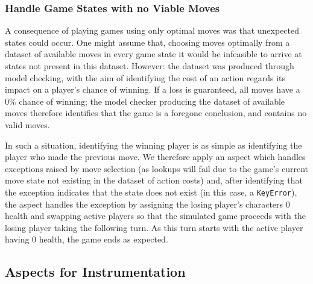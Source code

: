 \subsubsection{Handle Game States with no Viable Moves}


A consequence of playing games using only optimal moves was that unexpected
states could occur. One might assume that, choosing moves optimally from a
dataset of available moves in every game state it would be infeasible to arrive
at states not present in this dataset. However: the dataset was produced through
model checking, with the aim of identifying the cost of an action regards its
impact on a player's chance of winning. If a loss is guaranteed, all moves have
a 0\% chance of winning; the model checker producing the dataset of available
moves therefore identifies that the game is a foregone conclusion, and contains
no valid moves. 

In such a situation, identifying the winning player is as simple as identifying
the player who made the previous move. We therefore apply an aspect which handles
exceptions raised by move selection (as lookups will fail due to the game's current
move state not existing in the dataset of action costs) and, after identifying that
the exception indicates that the state does not exist (in this case, a 
\lstinline{KeyError}), the aspect handles the exception by assigning the losing player's
characters 0 health and swapping active players so that the simulated game proceeds with
the losing player taking the following turn. As this turn starts with the active player
having 0 health, the game ends as expected.


\subsection{Aspects for Instrumentation}\label{subsec:aspects_instrumenting_model}

